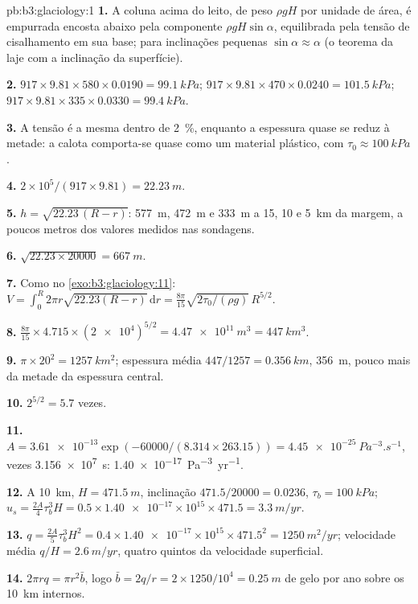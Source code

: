 \begin{solution}{pb:b3:glaciology:1}
\textbf{1.} A coluna acima do leito, de peso $\rho gH$ por unidade de área, é
empurrada encosta abaixo pela componente $\rho gH\sin\alpha$, equilibrada pela
tensão de cisalhamento em sua base; para inclinações pequenas $\sin\alpha \approx \alpha$ (o
teorema da laje com a inclinação da superfície).

\textbf{2.} $917\times9.81\times580\times0.0190 = \qty{99.1}{kPa}$;
$917\times9.81\times470\times0.0240 = \qty{101.5}{kPa}$; $917\times9.81
\times335\times0.0330 = \qty{99.4}{kPa}$.

\textbf{3.} A tensão é a mesma dentro de \qty{2}{\percent}, enquanto a
espessura quase se reduz à metade: a calota comporta-se quase como um material plástico, com $\tau_0 \approx
\qty{100}{kPa}$.

\textbf{4.} $2\times10^5/(917\times9.81) = \qty{22.23}{m}$.

\textbf{5.} $h = \sqrt{22.23\,(R - r)}$: \qty{577}{m}, \qty{472}{m} e
\qty{333}{m} a 15, 10 e \qty{5}{km} da margem, a poucos metros
dos valores medidos nas sondagens.

\textbf{6.} $\sqrt{22.23\times20000} = \qty{667}{m}$.

\textbf{7.} Como no \cref{exo:b3:glaciology:11}: $V = \int_0^R2\pi r
\sqrt{22.23(R - r)}\,\mathrm dr = \frac{8\pi}{15}\sqrt{2\tau_0/(\rho
g)}\,R^{5/2}$.

\textbf{8.} $\frac{8\pi}{15}\times4.715\times(\num{2e4})^{5/2} =
\qty{4.47e11}{m^3} = \qty{447}{km^3}$.

\textbf{9.} $\pi\times20^2 = \qty{1257}{km^2}$; espessura média
$447/1257 = \qty{0.356}{km}$, \qty{356}{m}, pouco mais da metade da
espessura central.

\textbf{10.} $2^{5/2} = 5.7$ vezes.

\textbf{11.} $A = \num{3.61e-13}\exp(-60000/(8.314\times263.15)) =
\qty{4.45e-25}{Pa^{-3}.s^{-1}}$, vezes \qty{3.156e7}{s}:
\qty{1.40e-17}{Pa^{-3}.yr^{-1}}.

\textbf{12.} A \qty{10}{km}, $H = \qty{471.5}{m}$, inclinação $471.5/20000 =
\num{0.0236}$, $\tau_b = \qty{100}{kPa}$; $u_s = \tfrac{2A}{4}\tau_b^3H =
0.5\times\num{1.40e-17}\times10^{15}\times471.5 = \qty{3.3}{m/yr}$.

\textbf{13.} $q = \tfrac{2A}{5}\tau_b^3H^2 = 0.4\times\num{1.40e-17}
\times10^{15}\times471.5^2 = \qty{1250}{m^2/yr}$; velocidade média $q/H =
\qty{2.6}{m/yr}$, quatro quintos da velocidade superficial.

\textbf{14.} $2\pi rq = \pi r^2\bar b$, logo $\bar b = 2q/r = 2\times1250/10^4
= \qty{0.25}{m}$ de gelo por ano sobre os \qty{10}{km} internos.


\end{solution}
